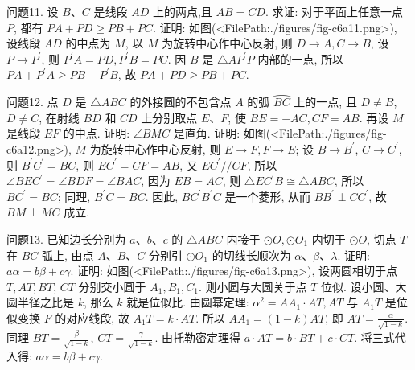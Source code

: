 问题11. 设 $B 、 C$ 是线段 $A D$ 上的两点,且 $A B=C D$. 求证: 对于平面上任意一点 $P$, 都有 $P A+P D \geqslant P B+P C$.
证明: 如图(<FilePath:./figures/fig-c6a11.png>), 设线段 $A D$ 的中点为 $M$, 以 $M$ 为旋转中心作中心反射, 则 $D \rightarrow A, C \rightarrow B$, 设 $P \rightarrow P^{\prime}$, 则 $P^{\prime} A=P D, P^{\prime} B=P C$. 因 $B$ 是 $\triangle A P^{\prime} P$ 内部的一点, 所以 $P A+P^{\prime} A \geqslant P B+P^{\prime} B$, 故 $P A+P D \geqslant P B+P C$.



问题12. 点 $D$ 是 $\triangle A B C$ 的外接圆的不包含点 $A$ 的弧 $\overparen{B C}$ 上的一点, 且 $D \neq B$, $D \neq C$, 在射线 $B D$ 和 $C D$ 上分别取点 $E 、 F$, 使 $B E=-A C, C F=A B$. 再设 $M$ 是线段 $E F$ 的中点.
证明: $\angle B M C$ 是直角.
证明: 如图(<FilePath:./figures/fig-c6a12.png>), $M$ 为旋转中心作中心反射, 则 $E \rightarrow F, F \rightarrow E$; 设 $B \rightarrow B^{\prime}$, $C \rightarrow C^{\prime}$, 则 $B^{\prime} C^{\prime}=B C$, 则 $E C^{\prime}=C F=A B$, 又 $E C^{\prime} / / C F$, 所以 $\angle B E C^{\prime}= \angle B D F=\angle B A C$, 因为 $E B=A C$, 则 $\triangle E C^{\prime} B \cong \triangle A B C$, 所以 $B C^{\prime}=B C$; 同理, $B^{\prime} C=B C$. 因此, $B C^{\prime} B^{\prime} C$ 是一个菱形, 从而 $B B^{\prime} \perp C C^{\prime}$, 故 $B M \perp M C$ 成立.



问题13. 已知边长分别为 $a 、 b 、 c$ 的 $\triangle A B C$ 内接于 $\odot O, \odot O_1$ 内切于 $\odot O$, 切点 $T$ 在 $B C$ 弧上, 由点 $A 、 B 、 C$ 分别引 $\odot O_1$ 的切线长顺次为 $\alpha 、 \beta 、 \lambda$. 证明: $a \alpha=b \beta+c \gamma$.
证明: 如图(<FilePath:./figures/fig-c6a13.png>), 设两圆相切于点 $T, A T, B T$, $C T$ 分别交小圆于 $A_1, B_1, C_1$. 则小圆与大圆关于点 $T$ 位似.
设小圆、大圆半径之比是 $k$, 那么 $k$ 就是位似比.
由圆幂定理: $\alpha^2=A A_1 \cdot A T, A T$ 与 $A_1 T$ 是位似变换 $F$ 的对应线段, 故 $A_1 T=k \cdot A T$. 所以 $A A_1= (1-k) A T$, 即 $A T=\frac{\alpha}{\sqrt{1-k}}$. 同理 $B T=\frac{\beta}{\sqrt{1-k}}$, $C T=\frac{\gamma}{\sqrt{1-k}}$. 由托勒密定理得 $a \cdot A T=b \cdot B T+c \cdot C T$. 将三式代入得: $a \alpha=b \beta+c \gamma$.



